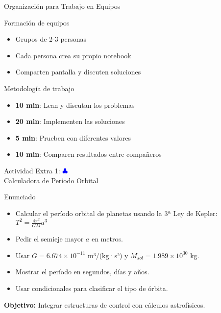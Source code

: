 \documentclass[10pt]{beamer}
\begin{document}
\begin{frame}{Organización para Trabajo en Equipos}
  \begin{block}{Formación de equipos}
    \begin{itemize}
      \item Grupos de 2-3 personas
      \item Cada persona crea su propio notebook
      \item Comparten pantalla y discuten soluciones
    \end{itemize}
  \end{block}
  
  \begin{block}{Metodología de trabajo}
    \begin{itemize}
      \item \textbf{10 min}: Lean y discutan los problemas
      \item \textbf{20 min}: Implementen las soluciones
      \item \textbf{5 min}: Prueben con diferentes valores
      \item \textbf{10 min}: Comparen resultados entre compañeros
    \end{itemize}
  \end{block}
\end{frame}

\begin{frame}{Actividad Extra 1: \hfill \textcolor{blue}{$\clubsuit$} \\ Calculadora de Período Orbital}
  \begin{block}{Enunciado}
    \begin{itemize}
      \item Calcular el período orbital de planetas usando la 3ª Ley de Kepler: $T^2 = \frac{4\pi^2}{GM}a^3$
      \item Pedir el semieje mayor \(a\) en metros.
      \item Usar \(G = 6.674 \times 10^{-11}\) m³/(kg·s²) y \(M_{sol} = 1.989 \times 10^{30}\) kg.
      \item Mostrar el período en segundos, días y años.
      \item Usar condicionales para clasificar el tipo de órbita.
    \end{itemize}
  \end{block}
  \textbf{Objetivo:} Integrar estructuras de control con cálculos astrofísicos.
\end{frame}
\end{document}

